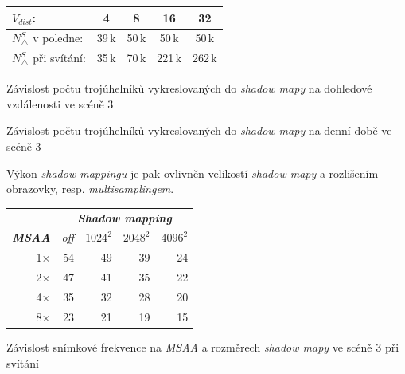 \begin{tableFloat}[H]
	\centering
	\def\arraystretch{1.1}
	\begin{tabular}{l || c c c c}
		$V_{dist}$: & 4 & 8 & 16 & 32 \\ \hline \hline
		$N_\triangle^S$ v poledne: & 39\,k & 50\,k & 50\,k & 50\,k \\
		$N_\triangle^S$ při svítání: & 35\,k & 70\,k & 221\,k & 262\,k
	\end{tabular}
	\caption{Závislost počtu trojúhelníků vykreslovaných do \textit{shadow mapy} na dohledové vzdálenosti ve scéně 3}
\end{tableFloat}

\begin{graphFloat}[H]
	\centering
	\caption{Závislost počtu trojúhelníků vykreslovaných do \textit{shadow mapy} na denní době ve scéně 3}
\end{graphFloat}

Výkon \textit{shadow mappingu} je pak ovlivněn velikostí \textit{shadow mapy} a rozlišením obrazovky, resp. \textit{multisamplingem}.

\begin{tableFloat}[H]
	\centering
	\def\arraystretch{1.1}
	\begin{tabular}{r || r r r r}
		& \multicolumn{4}{c}{\textbf{\textit{Shadow mapping}}} \\
		\textit{\textbf{MSAA}} & \textit{off} & $1024^2$ & $2048^2$ & $4096^2$ \\ \hline \hline
		1× & 54 & 49 & 39 & 24 \\
		2× & 47 & 41 & 35 & 22 \\
		4× & 35 & 32 & 28 & 20 \\
		8× & 23 & 21 & 19 & 15 \\
	\end{tabular}
	\caption{Závislost snímkové frekvence na \textit{MSAA} a rozměrech \textit{shadow mapy} ve scéně 3 při svítání}
	\label{table:MSAAShadowMapFPS}
\end{tableFloat}

